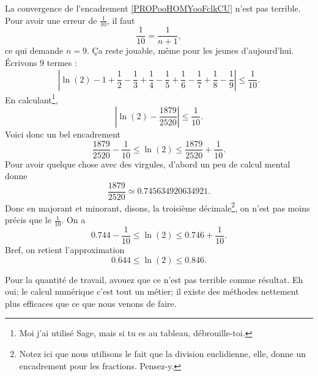\begin{example}      \label{EXooYMEEooMGpUNM}
	La convergence de l'encadrement \eqref{PROPooHOMYooFclkCU} n'est pas terrible. Pour avoir une erreur de \( \frac{1}{ 10 }\), il faut
	\begin{equation}
		\frac{1}{ 10 }=\frac{1}{ n+1 },
	\end{equation}
	ce qui demande \( n=9\). Ça reste jouable, même pour les jeunes d'aujourd'hui. Écrivons \( 9\) termes :
	\begin{equation}
		| \ln(2)-1+\frac{ 1 }{2}-\frac{1}{ 3 }+\frac{1}{ 4 }-\frac{1}{ 5 }+\frac{1}{ 6 }-\frac{ 1 }{ 7 }+\frac{1}{ 8 }-\frac{1}{ 9 } |\leq \frac{1}{ 10 }.
	\end{equation}
	En calculant\footnote{Moi j'ai utilisé Sage, mais si tu es au tableau, débrouille-toi.},
	\begin{equation}
		| \ln(2)-\frac{ 1879 }{ 2520 } |\leq\frac{1}{ 10 }.
	\end{equation}
	Voici donc un bel encadrement
	\begin{equation}
		\frac{ 1879 }{ 2520 }-\frac{1}{ 10 }\leq \ln(2)\leq \frac{ 1879 }{ 2520 }+\frac{1}{ 10 }.
	\end{equation}
	Pour avoir quelque chose avec des virgules, d'abord un peu de calcul mental donne
	\begin{equation}
		\frac{ 1879 }{ 2520 }\simeq 0.745634920634921.
	\end{equation}
	Donc en majorant et minorant, disons, la troisième décimale\footnote{Notez ici que nous utilisons le fait que la division euclidienne, elle, donne un encadrement pour les fractions. Pensez-y.}, on n'est pas moins précis que le \( \frac{1}{ 10 }\). On a
	\begin{equation}
		0.744-\frac{1}{ 10 }\leq \ln(2)\leq 0.746+\frac{1}{ 10 }.
	\end{equation}
	Bref, on retient l'approximation
	\begin{equation}
		0.644\leq \ln(2)\leq 0.846.
	\end{equation}

	Pour la quantité de travail, avouez que ce n'est pas terrible comme résultat. Eh oui; le calcul numérique c'est tout un métier; il existe des méthodes nettement plus efficaces que ce que nous venons de faire.
\end{example}

